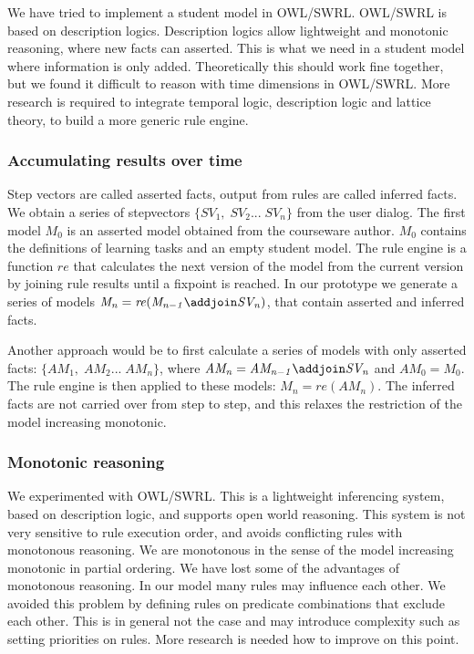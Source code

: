 We have tried to implement a student model in OWL/SWRL.
OWL/SWRL is based on description logics.
Description logics allow lightweight and  monotonic reasoning, where new facts can asserted.
This is what we need in a student model where information is only added.
Theoretically this should work fine together, but we found it difficult to reason with time dimensions in OWL/SWRL.
More research is required to integrate temporal logic, description logic and lattice theory, to build a more generic rule engine.

\subsubsection{Accumulating results over time}


Step vectors are called asserted facts, output from rules are called inferred facts.
We obtain a series of stepvectors $\{\mathit{SV_{1}, \;SV_{2}... \;SV_{n}} \}$ from the user dialog.
The first model $M_{0}$ is an asserted model obtained from the courseware author.
$M_{0}$ contains the definitions of learning tasks and an empty student model.
The rule engine is a function $\mathit{re}$ that calculates  the next version of the model from the current version by joining rule results until a fixpoint is reached.
In our prototype we generate a series of models $\mathit{M_{n} = re (M_{n-1} \addjoin SV_{n})}$, that contain asserted and inferred facts.

Another approach would be to first calculate a series of models with only asserted facts: $\{\mathit{AM_{1}, \;AM_{2}... \;AM_{n}} \}$,
where  $\mathit{AM_{n} = AM_{n-1} \addjoin SV_{n}}$ and $\mathit{AM_{0} = M_{0}}$.
The rule engine is then applied to these models: $\mathit{M_{n} = re (AM_{n})}$.
The inferred facts are not carried over from step to step, and this relaxes the restriction of the model increasing monotonic.

\subsubsection{Monotonic reasoning}
We experimented with OWL/SWRL. 
This is a lightweight inferencing system, based on description logic, and supports open world reasoning.
This system is not very sensitive to rule execution order, and avoids conflicting rules with monotonous reasoning.
We are monotonous in the sense of the model increasing monotonic in partial ordering.
We have lost some of the advantages of monotonous reasoning.
In our model many rules may influence each other.
We avoided this problem by defining rules on predicate combinations that exclude each other.
This is in general not the case and may introduce complexity such as setting priorities on rules.
More research is needed how to improve on this point.

